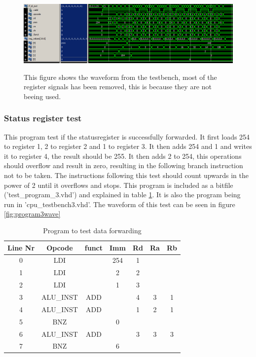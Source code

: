 \documentclass[11pt]{report}
\begin{document}
\begin{figure}
  \centering
  \includegraphics[width=.95\linewidth]{test3.png} \\
  \caption{This figure shows the waveform from the testbench, 
  most of the register signals has been removed, this is because they are not beeing used.}
  \label{fig:program2wave}
\end{figure}

\subsubsection*{Status register test}

This program test if the statusregister is successfully forwarded.
It first loads 254 to register 1, 2 to register 2 and 1 to register 3.
It then adds 254 and 1 and writes it to register 4, the result should be
255. It then adds 2 to 254, this operations should overflow and result in zero,
resulting in the following branch instruction not to be taken. The instructions
following this test should count upwards in the power of 2 until it overflows
and stops. This program is included as a bitfile ('test\_program\_3.vhd') and
explained in table \ref{tab:program3table}. It is also the program being run in 'cpu\_testbench3.vhd'.
The waveform of this test can be seen in figure \ref{fig:program3wave}

\begin{table}[htbp]
  \centering
  \begin{tabular}{|c|c|c|c|c|c|c|}
    \hline
    Line Nr &	Opcode		&	funct	&	Imm	&	Rd	&	Ra	&	Rb	\\\hline
    	0	&	LDI			&			&	254	&	1	&		&		\\\hline
    	1	&	LDI			&			&	2	&	2	&		&		\\\hline
    	2	&	LDI			&			&	1	&	3	&		&		\\\hline
    	3	&	ALU\_INST	&	ADD		&		&	4	&	3	&	1	\\\hline
    	4	&	ALU\_INST	&	ADD		&		&	1	&	2	&	1	\\\hline
    	5	&	BNZ			&			&	0	&		&		&		\\\hline
    	6	&	ALU\_INST	&	ADD		&		&	3	&	3	&	3	\\\hline
    	7	&	BNZ			&			&	6	&		&		&		\\\hline

  \end{tabular}
  \caption{Program to test data forwarding}
  \label{tab:program3table}
\end{table}
\end{document}
